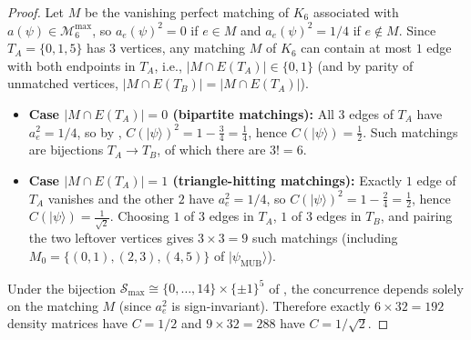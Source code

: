 \documentclass[11pt,a4paper]{article}
\theoremstyle{plain}
\theoremstyle{definition}
\theoremstyle{remark}
\newcommand{\ket}[1]{\lvert #1 \rangle}
\newcommand{\Mman}{\mathcal{M}_6}
\newcommand{\psimub}{\ket{\psi_{\mathrm{MUB}}}}
\begin{document}
\begin{proof}
Let $M$ be the vanishing perfect matching of $K_6$ associated with $a(\psi) \in \Mman^{\max}$, so $a_e(\psi)^2 = 0$ if $e \in M$ and $a_e(\psi)^2 = 1/4$ if $e \notin M$. Since $T_A = \{0,1,5\}$ has $3$ vertices, any matching $M$ of $K_6$ can contain at most $1$ edge with both endpoints in $T_A$, i.e., $\lvert M \cap E(T_A)\rvert \in \{0, 1\}$ (and by parity of unmatched vertices, $\lvert M \cap E(T_B)\rvert = \lvert M \cap E(T_A)\rvert$).
\begin{itemize}[leftmargin=1.8em, itemsep=2pt]
  \item \textbf{Case $\lvert M \cap E(T_A)\rvert = 0$ (bipartite matchings):} All $3$ edges of $T_A$ have $a_e^2 = 1/4$, so by , $C(\ket{\psi})^2 = 1 - \frac{3}{4} = \frac{1}{4}$, hence $C(\ket{\psi}) = \frac{1}{2}$. Such matchings are bijections $T_A \to T_B$, of which there are $3! = 6$.
  \item \textbf{Case $\lvert M \cap E(T_A)\rvert = 1$ (triangle-hitting matchings):} Exactly $1$ edge of $T_A$ vanishes and the other $2$ have $a_e^2 = 1/4$, so $C(\ket{\psi})^2 = 1 - \frac{2}{4} = \frac{1}{2}$, hence $C(\ket{\psi}) = \frac{1}{\sqrt{2}}$. Choosing $1$ of $3$ edges in $T_A$, $1$ of $3$ edges in $T_B$, and pairing the two leftover vertices gives $3 \times 3 = 9$ such matchings (including $M_0 = \{(0,1),(2,3),(4,5)\}$ of $\psimub$).
\end{itemize}
Under the bijection $\mathcal{S}_{\max} \cong \{0,\dots,14\} \times \{\pm 1\}^5$ of , the concurrence depends solely on the matching $M$ (since $a_e^2$ is sign-invariant). Therefore exactly $6 \times 32 = 192$ density matrices have $C = 1/2$ and $9 \times 32 = 288$ have $C = 1/\sqrt{2}$.
\end{proof}
\end{document}
